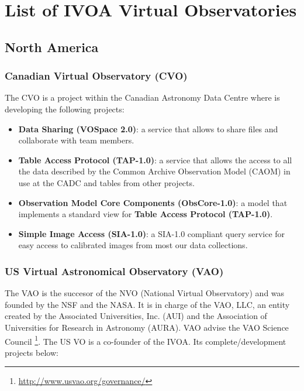 \section{List of IVOA Virtual Observatories}
\subsection{North America}
\subsubsection{Canadian Virtual Observatory (CVO)}
The CVO \cite{website:cvo-home} \nocite{SchadeDowlerDurand2004} is a project
within the Canadian Astronomy Data Centre where is developing the following
projects:

\begin{itemize}
\item \textbf{Data Sharing (VOSpace 2.0)}:
a service that allows to share files and collaborate with team members.

\item \textbf{Table Access Protocol (TAP-1.0)}:
a service that allows the access to all the data
described by the Common Archive Observation Model (CAOM) in use at the CADC and
tables from other projects.

\item \textbf{Observation Model Core Components (ObsCore-1.0)}:
a model that implements a standard view for \textbf{Table Access Protocol
                                                    (TAP-1.0)}.

\item \textbf{Simple Image Access (SIA-1.0)}:
a SIA-1.0 compliant query service for easy access to calibrated images from most
our data collections.
\end{itemize}

\subsubsection{US Virtual Astronomical Observatory (VAO)}
The VAO \cite{website:vao-home} \nocite{DeYoung2010} is the succesor of the NVO
(National Virtual Observatory) and was founded by the NSF and the NASA. It is in
charge of the VAO, LLC, an entity created by the Associated Universities, Inc.
(AUI) and the Association of Universities for Research in Astronomy (AURA). VAO
advise the VAO Science Council
\footnote{\url{http://www.usvao.org/governance/}}. The US VO is a co-founder of
the IVOA. Its complete/development projects below:


